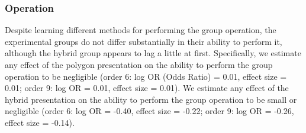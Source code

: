 \documentclass[man,10pt]{apa6}
\begin{document}
\subsubsection{Operation}
Despite learning different methods for performing the group operation, the experimental groups do not differ substantially in their ability to perform it, although the hybrid group appears to lag a little at first. Specifically, we estimate any effect of the polygon presentation on the ability to perform the group operation to be negligible (order 6: log OR (Odds Ratio) = 0.01, effect size = 0.01; order 9: log OR = 0.01, effect size = 0.01). We estimate any effect of the hybrid presentation on the ability to perform the group operation to be small or negligible (order 6: log OR = -0.40, effect size = -0.22; order 9: log OR = -0.26, effect size = -0.14).\par 
\end{document}
